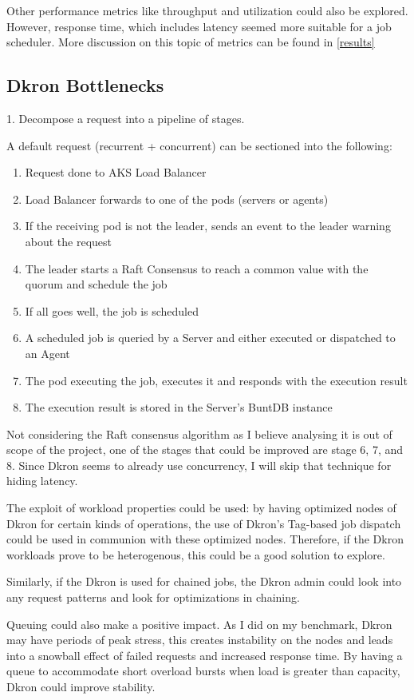 \documentclass[runningheads]{llncs}
\begin{document}
Other performance metrics like throughput and utilization could also be explored.
However, response time, which includes latency seemed more suitable for a job scheduler.
More discussion on this topic of metrics can be found in \ref{results}


\subsection{Dkron Bottlenecks}
1. Decompose a request into a pipeline of stages.

A default request (recurrent + concurrent) can be sectioned into the following:
\begin{enumerate}
    \item Request done to AKS Load Balancer
    \item Load Balancer forwards to one of the pods (servers or agents)
    \item If the receiving pod is not the leader, sends an event to the leader warning about the request
    \item The leader starts a Raft Consensus to reach a common value with the quorum and schedule the job
    \item If all goes well, the job is scheduled
    \item A scheduled job is queried by a Server and either executed or dispatched to an Agent
    \item The pod executing the job, executes it and responds with the execution result
    \item The execution result is stored in the Server's BuntDB instance
\end{enumerate}

Not considering the Raft consensus algorithm as I believe analysing it is out of scope of the project,
one of the stages that could be improved are stage 6, 7, and 8.
Since Dkron seems to already use concurrency, I will skip that technique for hiding latency.

The exploit of workload properties could be used: by having optimized nodes of Dkron for certain
kinds of operations, the use of Dkron's Tag-based job dispatch could be used in communion with these
optimized nodes. Therefore, if the Dkron workloads prove to be heterogenous, this could be a good
solution to explore.

Similarly, if the Dkron is used for chained jobs, the Dkron admin could look into any request patterns
and look for optimizations in chaining.

Queuing could also make a positive impact. As I did on my benchmark, Dkron may have periods of peak stress,
this creates instability on the nodes and leads into a snowball effect of failed requests and increased
response time. By having a queue to accommodate short overload bursts when load is greater than capacity,
Dkron could improve stability.
\end{document}
